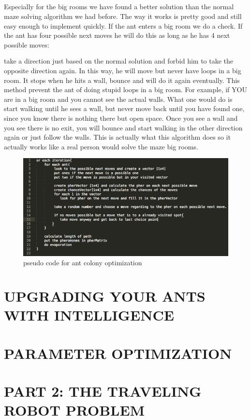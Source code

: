 \documentclass{scrartcl}
\begin{document}
\subsection{}
Especially for the big rooms we have found a better solution than the normal maze solving algorithm we had before. The way it works is pretty good and still easy enough to implement quickly. If the ant enters a big room we do a check. If the ant has four possible next moves he will do this as long as he has 4 next possible moves:\par
take a direction just based on the normal solution and forbid him to take the opposite direction again.
In this way, he will move but never have loops in a big room. It stops when he hits a wall, bounce and will do it again eventually. This method prevent the ant of doing stupid loops in a big room. For example, if YOU are in a big room and you cannot see the actual walls. What one would do is start walking until he sees a wall, but never move back until you have found one, since you know there is nothing there but open space. Once you see a wall and you see there is no exit, you will bounce and start walking in the other direction again or just follow the walls. This is actually what this algorithm does so it actually works like a real person would solve the maze big rooms.
\begin{figure}[p]
    \centering
    \includegraphics[width=1\textwidth]{pseudo.PNG}
    \caption{pseudo code for ant colony optimization}
    \label{fig:speudo}
\end{figure}

\section{UPGRADING YOUR ANTS WITH INTELLIGENCE}
\section{PARAMETER OPTIMIZATION}
\pagebreak
\section{PART 2: THE TRAVELING ROBOT PROBLEM}





 
 
 
 	
		 
		 
		
 
\end{document}
